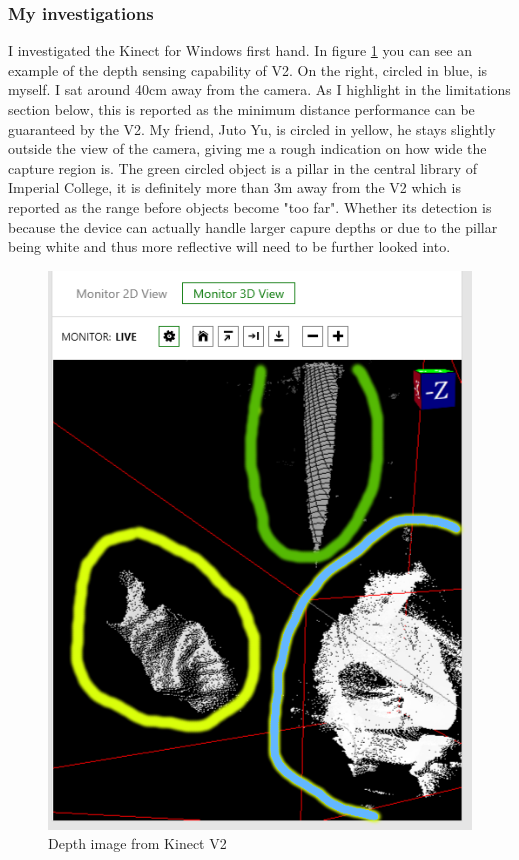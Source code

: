 \documentclass[11pt]{article}
\begin{document}
\subsubsection{My investigations} 
I investigated the Kinect for Windows first hand. In figure \ref{KinectDepth} 
you can see an example of the depth sensing capability of V2. On the right,
circled in blue, is myself. I sat around 40cm away from the camera. As I highlight 
in the limitations section below, this is reported as the minimum distance 
performance can be guaranteed by the V2. My friend, Juto Yu, is circled in 
yellow, he stays slightly outside the view of the camera, giving me a rough 
indication on how wide the capture region is. The green circled object is a 
pillar in the central library of Imperial College, it is definitely more than 
3m away from the V2 which is reported as the range before objects become 
"too far". Whether its detection is because the device can actually 
handle larger capure depths or due to the pillar being white and thus 
more reflective will need to be further looked into.
\begin{center}
	\begin{figure}[H]
		\begin{center}
			\includegraphics[scale=0.5]{pics/KinectDepth}
				\caption{Depth image from Kinect V2}
				\label{KinectDepth}
		\end{center}
	\end{figure}
\end{center}
\end{document}
